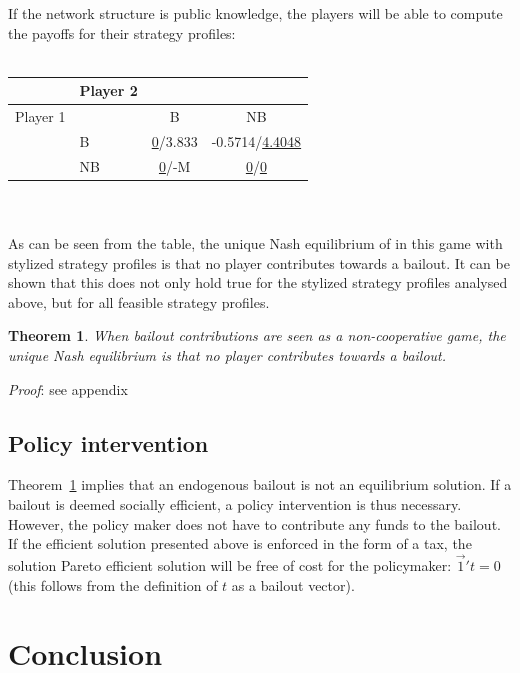 \documentclass[12pt,a4paper]{article}
\newtheorem{theorem}{Theorem}
\begin{document}
If the network structure is public knowledge, the players will be able to compute the payoffs for their strategy profiles:
\\
\\
\begin{tabular}{|l|l|c|c|}
\hline
 & Player 2 & & \\
\hline
Player 1 & & B & NB \\
\hline
 & B & \underline{0}/3.833 & -0.5714/\underline{4.4048} \\
\hline
 & NB & \underline{0}/-M & \underline{0}/\underline{0} \\
\hline
\end{tabular}
\\
\\

As can be seen from the table, the unique Nash equilibrium of in this game with stylized strategy profiles is that no player contributes towards a bailout. It can be shown that this does not only hold true for the stylized strategy profiles analysed above, but for all feasible strategy profiles.

\begin{theorem} \label{the:equilibrium}
When bailout contributions are seen as a non-cooperative game, the unique Nash equilibrium is that no player contributes towards a bailout.
\end{theorem}

\textit{Proof}: see appendix

\subsection{Policy intervention}
Theorem~\ref{the:equilibrium} implies that an endogenous bailout is not an equilibrium solution. If a bailout is deemed socially efficient, a policy intervention is thus necessary. However, the policy maker does not have to contribute any funds to the bailout. If the efficient solution presented above is enforced in the form of a tax, the solution Pareto efficient solution will be free of cost for the policymaker: $\vec{1}' t=0$ (this follows from the definition of $t$ as a bailout vector).

\section{Conclusion}
\label{sec:conclusion}

 


\appendix
\end{document}
